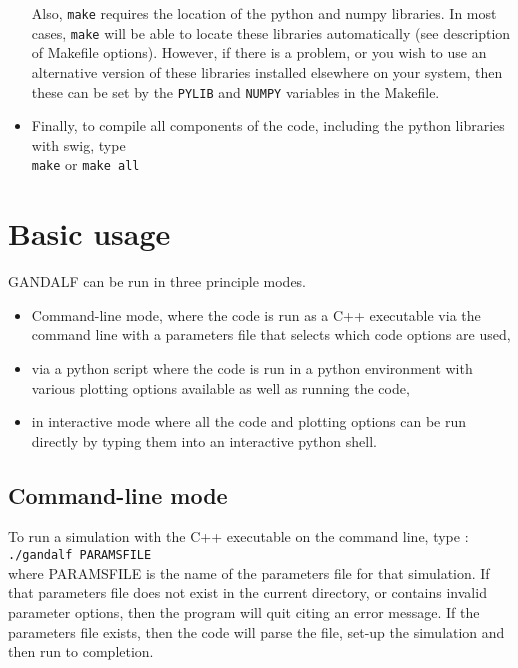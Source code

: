 \documentclass[a4paper]{article}
\newcommand{\var}[1]{\texttt{#1}}
\begin{document}
\begin{itemize}
Also, \var{make} requires the location of the python and numpy libraries.  In most cases, \var{make} will be able to locate these libraries automatically (see description of Makefile options).  However, if there is a problem, or you wish to use an alternative version of these libraries installed elsewhere on your system, then these can be set by the \var{PYLIB} and \var{NUMPY} variables in the Makefile.


\item Finally, to compile all components of the code, including the python libraries with swig, type \\
\newline
\noindent \var{make} or \var{make all} \\

\end{itemize}

\newpage


\section{Basic usage}
GANDALF can be run in three principle modes.
\begin{itemize}
\item Command-line mode, where the code is run as a C++ executable via the command line with a parameters file that selects which code options are used,
\item via a python script where the code is run in a python environment with various plotting options available as well as running the code,
\item in interactive mode where all the code and plotting options can be run directly by typing them into an interactive python shell.
\end{itemize}



\subsection{Command-line mode}

\noindent To run a simulation with the C++ executable on the command line, type : \\
\newline
\var{./gandalf PARAMSFILE} \\
\newline
where PARAMSFILE is the name of the parameters file for that simulation.  If that parameters file does not exist in the current directory, or contains invalid parameter options, then the program will quit citing an error message.  If the parameters file exists, then the code will parse the file, set-up the simulation and then run to completion.
\end{document}
